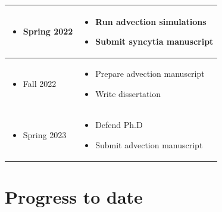 \documentclass[a4paper]{article}
\begin{document}
\begin{centering}
{\begin{longtable}{|p{}|p{}|}
    \hline
    \begin{itemize}
    \raggedleft 
        \item[] Spring 2022
    \end{itemize}
    &
    \begin{itemize} 
        \item Run advection simulations
        \item Submit syncytia manuscript
    \end{itemize}\\
    \hline
    \begin{itemize}
    \raggedleft 
        \item[] Fall 2022
    \end{itemize}
    & 
    \begin{itemize} 
        \item Prepare advection manuscript
        \item Write dissertation
    \end{itemize}\\
    \hline
    \begin{itemize}
    \raggedleft 
        \item[] Spring 2023 
    \end{itemize}
    & 
    \begin{itemize} 
        \item Defend Ph.D
        \item Submit advection manuscript
    \end{itemize}\\
    \hline
\end{longtable}
}
\end{centering}

\section{Progress to date}

%
\end{document}
